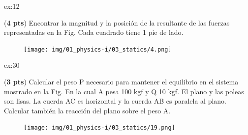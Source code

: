 \begin{multicols}{2}
     \begin{excercise}[][][$R=25.7\ \mathrm{lbf}$, $y=$]{ex:12}{
         (\textbf{4 pts})
         Encontrar la magnitud y la posición de la resultante de las fuerzas representadas en la Fig.  Cada cuadrado tiene 1 pie de lado.
         \begin{figure}[H]
             \centering
             \texttt{[image: img/01\_physics-i/03\_statics/4.png]}
         \end{figure}
         }
     \end{excercise}
    \begin{excercise}[][][$P=587\ \mathrm{Kgf} $, $R=81.5\ \mathrm{Kgf}$]{ex:30}{
        (\textbf{3 pts})
        Calcular el peso P necesario para mantener el equilibrio en el sistema mostrado en la Fig. En la cual A pesa 100 kgf y Q 10 kgf. El plano y las poleas son lisas. La cuerda AC es horizontal y la cuerda AB es paralela al plano. Calcular también la reacción del plano sobre el peso A.     
         \begin{figure}[H]
             \centering
             \texttt{[image: img/01\_physics-i/03\_statics/19.png]}
         \end{figure}
         } 
     \end{excercise}

\end{multicols}
